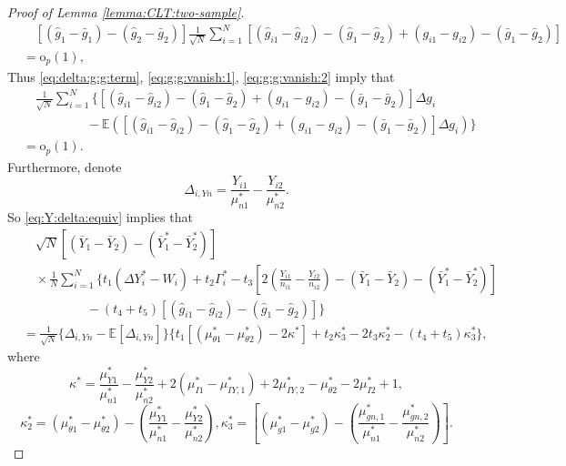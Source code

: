 \documentclass[12pt,letterpaper]{article}
\begin{document}
\begin{proof}[Proof of Lemma \ref{lemma:CLT:two-sample}]
\begin{equation}\label{eq:g:g:vanish:2}
\begin{array}{rl}
&\quad\displaystyle[(\hat{g}_1-\bar{g}_1)-(\hat{g}_2-\bar{g}_2)]\frac{1}{\sqrt{N}}\sum_{i=1}^N[(\hat{g}_{i1}-\hat{g}_{i2})-(\hat{g}_1-\hat{g}_2)+(g_{i1}-g_{i2})-(\bar{g}_1-\bar{g}_2)]\\
&\displaystyle=\mathrm{o}_p(1),
\end{array}
\end{equation}
Thus \eqref{eq:delta:g:g:term}, \eqref{eq:g:g:vanish:1}, \eqref{eq:g:g:vanish:2} imply that 
\begin{equation}\label{eq:delta:g:g:equiv:asymptotics}
\begin{array}{rl}
&\quad\displaystyle\frac{1}{\sqrt{N}}\sum_{i=1}^N\big\{[(\hat{g}_{i1}-\hat{g}_{i2})-(\hat{g}_1-\hat{g}_2)+(g_{i1}-g_{i2})-(\bar{g}_1-\bar{g}_2)]\Delta g_i\\
&\displaystyle\quad\quad\quad\quad\quad-\mathbb{E}\left([(\hat{g}_{i1}-\hat{g}_{i2})-(\hat{g}_1-\hat{g}_2)+(g_{i1}-g_{i2})-(\bar{g}_1-\bar{g}_2)]\Delta g_i\right)\big\}\\
&\displaystyle=\mathrm{o}_p(1).
\end{array}
\end{equation}
Furthermore, denote
$$\Delta_{i,Yn}=\frac{Y_{i1}}{\mu_{n1}^*}-\frac{Y_{i2}}{\mu_{n2}^*}.$$
So \eqref{eq:Y:delta:equiv} implies that 
\begin{equation}\label{eq:Y:delta:equiv:notation}
\begin{array}{rl}
&\displaystyle\quad\sqrt{N}\left[(\bar{Y}_1-\bar{Y}_2)-(\bar{Y}_1^*-\bar{Y}_2^*)\right]\\
&\displaystyle\quad\times\frac{1}{N}\sum_{i=1}^N\Bigg\{t_1(\Delta Y_i^*-W_i)+t_2\Gamma_i^*-t_3\left[2\left(\frac{Y_{i1}}{n_{i1}}-\frac{Y_{i2}}{n_{i2}}\right)-(\bar{Y}_1-\bar{Y}_2)-(\bar{Y}_1^*-\bar{Y}_2^*)\right]\\
&\displaystyle\quad\quad\quad\quad\quad-(t_4+t_5)[(\hat{g}_{i1}-\hat{g}_{i2})-(\hat{g}_1-\hat{g}_2)]\Bigg\}\\
&\displaystyle=\frac{1}{\sqrt{N}}\{\Delta_{i,Yn}-\mathbb{E}[\Delta_{i,Yn}]\}\{t_1[(\mu_{\theta1}^*-\mu_{\theta2}^*)-2\kappa^*]+t_2\kappa_3^*-2t_3\kappa_2^*-(t_4+t_5)\kappa_3^*\},
\end{array}
\end{equation}
where
$$\kappa^*=\frac{\mu_{Y1}^*}{\mu_{n1}^*}-\frac{\mu_{Y2}^*}{\mu_{n2}^*}+2(\mu_{I1}^*-\mu_{IY,1}^*)+2\mu_{IY,2}^*-\mu_{\theta2}^*-2\mu_{I2}^*+1,$$
$$\kappa_2^*=\left(\mu_{\theta1}^*-\mu_{\theta2}^*\right)-\left(\frac{\mu_{Y1}^*}{\mu_{n1}^*}-\frac{\mu_{Y2}^*}{\mu_{n2}^*}\right),\kappa_3^*=\left[(\mu_{g1}^*-\mu_{g2}^*)-\left(\frac{\mu_{gn,1}^*}{\mu_{n1}^*}-\frac{\mu_{gn,2}^*}{\mu_{n2}^*}\right)\right].$$




\end{proof}
\end{document}
